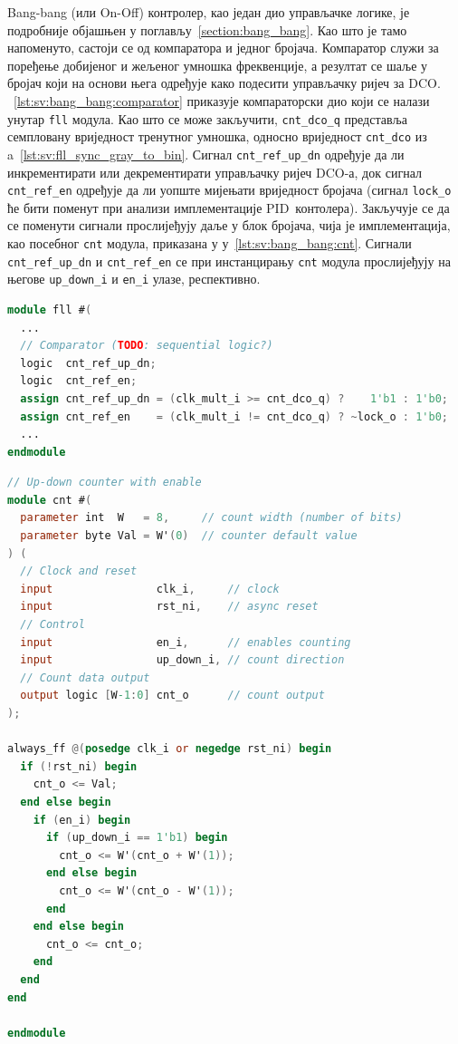 \documentclass[master]{finthesis}
\newcommand*{\prog}[1]{\texttt{#1}}
\def \DCO  {DCO} %
\def \PID  {PID} %
\begin{document}
Bang-bang (или On-Off) контролер, као један дио управљачке логике, је подробније објашњен у поглављу~\ref{section:bang_bang}. Као што је тамо напоменуто, састоји се од компаратора и једног бројача. Компаратор служи за поређење добијеног и жељеног умношка фреквенције, а резултат се шаље у бројач који на основи њега одређује како подесити управљачку ријеч за \DCO. \lstlistingname~\ref{lst:sv:bang_bang:comparator} приказује компараторски дио који се налази унутар \prog{fll} модула. Као што се може закључити, \prog{cnt\_dco\_q} представља семпловану вриједност тренутног умношка, односно вриједност \prog{cnt\_dco} из \lstlistingname{a}~\ref{lst:sv:fll_sync_gray_to_bin}. Сигнал \prog{cnt\_ref\_up\_dn} одређује да ли инкрементирати или декрементирати управљачку ријеч \DCO-а, док сигнал \prog{cnt\_ref\_en} одређује да ли уопште мијењати вриједност бројача (сигнал \prog{lock\_o} ће бити поменут при анализи имплементације \PID\ контолера). Закључује се да се поменути сигнали прослијеђују даље у блок бројача, чија је имплементација, као посебног \prog{cnt} модула, приказана у \lstlistingname{у}~\ref{lst:sv:bang_bang:cnt}. Сигнали \prog{cnt\_ref\_up\_dn} и \prog{cnt\_ref\_en} се при инстанцирању \prog{cnt} модула прослијеђују на његове \prog{up\_down\_i} и \prog{en\_i} улазе, респективно. \par
\begin{lstlisting}[language=Verilog, caption={Компараторски дио bang-bang контролера.}, label={lst:sv:bang_bang:comparator}]
module fll #(
  ...
  // Comparator (TODO: sequential logic?)
  logic  cnt_ref_up_dn;
  logic  cnt_ref_en;
  assign cnt_ref_up_dn = (clk_mult_i >= cnt_dco_q) ?    1'b1 : 1'b0;
  assign cnt_ref_en    = (clk_mult_i != cnt_dco_q) ? ~lock_o : 1'b0;
  ...
endmodule
\end{lstlisting}
\begin{lstlisting}[language=Verilog, caption={Имплементација бројача из bang-bang контролера.}, label={lst:sv:bang_bang:cnt}]
// Up-down counter with enable
module cnt #(
  parameter int  W   = 8,     // count width (number of bits)
  parameter byte Val = W'(0)  // counter default value
) (
  // Clock and reset
  input                clk_i,     // clock
  input                rst_ni,    // async reset
  // Control
  input                en_i,      // enables counting
  input                up_down_i, // count direction
  // Count data output
  output logic [W-1:0] cnt_o      // count output
);

always_ff @(posedge clk_i or negedge rst_ni) begin
  if (!rst_ni) begin
    cnt_o <= Val;
  end else begin
    if (en_i) begin
      if (up_down_i == 1'b1) begin
        cnt_o <= W'(cnt_o + W'(1));
      end else begin
        cnt_o <= W'(cnt_o - W'(1));
      end
    end else begin
      cnt_o <= cnt_o;
    end
  end
end

endmodule
\end{lstlisting}
\end{document}
